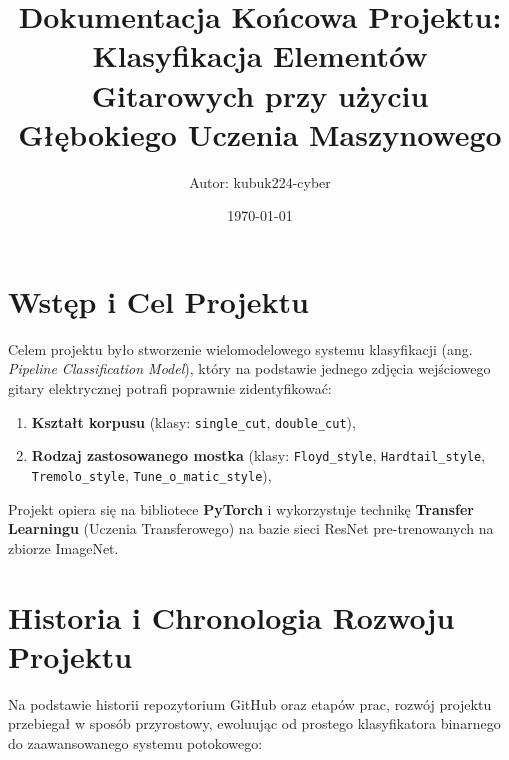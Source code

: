 \documentclass[12pt,a4paper]{article}
\title{\textbf{Dokumentacja Końcowa Projektu:\\Klasyfikacja Elementów Gitarowych przy użyciu Głębokiego Uczenia Maszynowego}}
\author{Autor: kubuk224-cyber}
\date{\today}
\begin{document}
\maketitle
\newpage
\tableofcontents
\newpage

\section{Wstęp i Cel Projektu}
Celem projektu było stworzenie wielomodelowego systemu klasyfikacji (ang. \textit{Pipeline Classification Model}), który na podstawie jednego zdjęcia wejściowego gitary elektrycznej potrafi poprawnie zidentyfikować:
\begin{enumerate}
    \item \textbf{Kształt korpusu} (klasy: \texttt{single\_cut}, \texttt{double\_cut}),
    \item \textbf{Rodzaj zastosowanego mostka} (klasy: \texttt{Floyd\_style}, \texttt{Hardtail\_style}, \texttt{Tremolo\_style}, \texttt{Tune\_o\_matic\_style}),
\end{enumerate}

Projekt opiera się na bibliotece \textbf{PyTorch} i wykorzystuje technikę \textbf{Transfer Learningu} (Uczenia Transferowego) na bazie sieci ResNet pre-trenowanych na zbiorze ImageNet.

\section{Historia i Chronologia Rozwoju Projektu}
Na podstawie historii repozytorium GitHub oraz etapów prac, rozwój projektu przebiegał w sposób przyrostowy, ewoluując od prostego klasyfikatora binarnego do zaawansowanego systemu potokowego:
\end{document}
